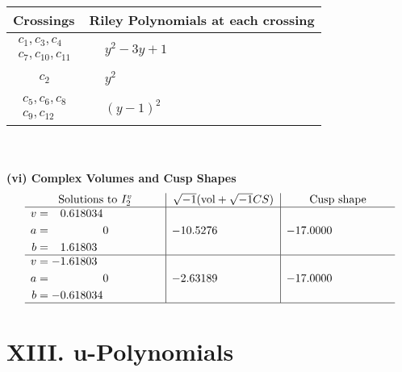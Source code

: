 \documentclass[1p]{elsarticle_modified}
\theoremstyle{definition}
\newcommand{\I}{\sqrt{-1}}
\begin{document}
\begin{tabular}{m{50pt}|m{274pt}}
Crossings & \hspace{64pt}Riley Polynomials at each crossing \\
\hline $$\begin{aligned}c_{1},c_{3},c_{4}\\c_{7},c_{10},c_{11}\end{aligned}$$&$\begin{aligned}
&y^2-3 y+1
\end{aligned}$\\
\hline $$\begin{aligned}c_{2}\end{aligned}$$&$\begin{aligned}
&y^2
\end{aligned}$\\
\hline $$\begin{aligned}c_{5},c_{6},c_{8}\\c_{9},c_{12}\end{aligned}$$&$\begin{aligned}
&(y-1)^2
\end{aligned}$\\
\hline
\end{tabular}\\~\\
\newpage\flushleft \textbf{(vi) Complex Volumes and Cusp Shapes}
$$\begin{array}{c|c|c}  
\text{Solutions to }I^v_{2}& \I (\text{vol} + \sqrt{-1}CS) & \text{Cusp shape}\\
 \hline 
\begin{aligned}
v &= \phantom{-}0.618034\phantom{ +0.000000I} \\
a &= \phantom{-0.000000 } 0 \\
b &= \phantom{-}1.61803\phantom{ +0.000000I}\end{aligned}
 & -10.5276\phantom{ +0.000000I} & -17.0000\phantom{ +0.000000I} \\ \hline\begin{aligned}
v &= -1.61803\phantom{ +0.000000I} \\
a &= \phantom{-0.000000 } 0 \\
b &= -0.618034\phantom{ +0.000000I}\end{aligned}
 & -2.63189\phantom{ +0.000000I} & -17.0000\phantom{ +0.000000I}\\
 \hline 
 \end{array}$$\newpage
\newpage\renewcommand{\arraystretch}{1}
\centering \section*{ XIII. u-Polynomials}
\end{document}
